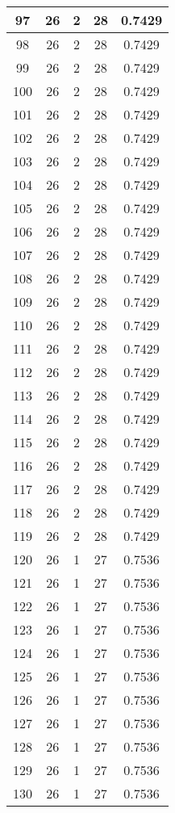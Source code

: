 \documentclass[letterpaper, 12pt]{article}
\begin{document}
\begin{longtable}{|c|c|c|c|c|}
\hline
97 & 26 & 2 & 28 & 0.7429 \\
\hline
98 & 26 & 2 & 28 & 0.7429 \\
\hline
99 & 26 & 2 & 28 & 0.7429 \\
\hline
100 & 26 & 2 & 28 & 0.7429 \\
\hline
101 & 26 & 2 & 28 & 0.7429 \\
\hline
102 & 26 & 2 & 28 & 0.7429 \\
\hline
103 & 26 & 2 & 28 & 0.7429 \\
\hline
104 & 26 & 2 & 28 & 0.7429 \\
\hline
105 & 26 & 2 & 28 & 0.7429 \\
\hline
106 & 26 & 2 & 28 & 0.7429 \\
\hline
107 & 26 & 2 & 28 & 0.7429 \\
\hline
108 & 26 & 2 & 28 & 0.7429 \\
\hline
109 & 26 & 2 & 28 & 0.7429 \\
\hline
110 & 26 & 2 & 28 & 0.7429 \\
\hline
111 & 26 & 2 & 28 & 0.7429 \\
\hline
112 & 26 & 2 & 28 & 0.7429 \\
\hline
113 & 26 & 2 & 28 & 0.7429 \\
\hline
114 & 26 & 2 & 28 & 0.7429 \\
\hline
115 & 26 & 2 & 28 & 0.7429 \\
\hline
116 & 26 & 2 & 28 & 0.7429 \\
\hline
117 & 26 & 2 & 28 & 0.7429 \\
\hline
118 & 26 & 2 & 28 & 0.7429 \\
\hline
119 & 26 & 2 & 28 & 0.7429 \\
\hline
120 & 26 & 1 & 27 & 0.7536 \\
\hline
121 & 26 & 1 & 27 & 0.7536 \\
\hline
122 & 26 & 1 & 27 & 0.7536 \\
\hline
123 & 26 & 1 & 27 & 0.7536 \\
\hline
124 & 26 & 1 & 27 & 0.7536 \\
\hline
125 & 26 & 1 & 27 & 0.7536 \\
\hline
126 & 26 & 1 & 27 & 0.7536 \\
\hline
127 & 26 & 1 & 27 & 0.7536 \\
\hline
128 & 26 & 1 & 27 & 0.7536 \\
\hline
129 & 26 & 1 & 27 & 0.7536 \\
\hline
130 & 26 & 1 & 27 & 0.7536 \\

\end{longtable}
\end{document}
